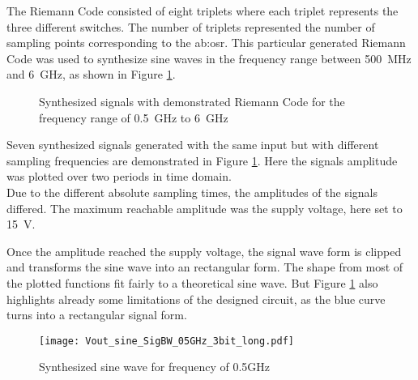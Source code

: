  The Riemann Code consisted of eight triplets where each triplet represents the three different switches.
The number of triplets represented the number of sampling points corresponding to the \gls{ab:osr}.
This particular generated Riemann Code was used to synthesize sine waves in the frequency range between \SI{500}{\MHz} and \SI{6}{\GHz}, as shown in Figure \ref{fig:7SignalsSameSlopeInOnePlot}.

\begin{figure}[htb!]
   \centering 
   
   \caption{Synthesized signals with demonstrated Riemann Code for the frequency range of \SI{0.5}{\GHz} to \SI{6}{\GHz}}
   \label{fig:7SignalsSameSlopeInOnePlot}
\end{figure}

Seven synthesized signals generated with the same input but with different sampling frequencies are demonstrated in Figure \ref{fig:7SignalsSameSlopeInOnePlot}.
Here the signals amplitude was plotted over two periods in time domain.\\
Due to the different absolute sampling times, the amplitudes of the signals differed.
The maximum reachable amplitude was the supply voltage, here set to \SI{15}{\volt}. %

Once the amplitude reached the supply voltage, the signal wave form is clipped and transforms the sine wave into an rectangular form.
The shape from most of the plotted functions fit fairly to a theoretical sine wave.
But Figure \ref{fig:7SignalsSameSlopeInOnePlot} also highlights already some limitations of the designed circuit, as the blue curve turns into a rectangular signal form.\\

\begin{figure}[htb!]
   \centering
   \texttt{[image: Vout\_sine\_SigBW\_05GHz\_3bit\_long.pdf]}
   \caption{Synthesized sine wave for frequency of 0.5GHz}
   \label{fig:SineWave05GHz}
\end{figure}

